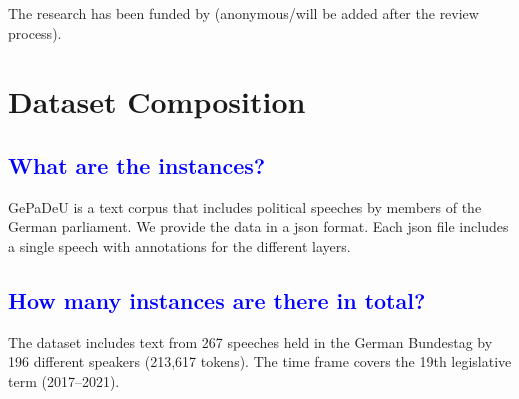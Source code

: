 \documentclass[letterpaper, 10 pt, conference]{ieeeconf}  %
\newcommand{\gepadeu}{{\sc GePaDeU}}
\begin{document}
The research has been funded by  (anonymous/will be added after the review process).

  

\vspace{1.8cm}

\section{Dataset Composition}

\textcolor{blue}{\subsection{What are the instances?}}

\gepadeu{} is a text corpus that includes political speeches by members of the German parliament. We provide the data in a json format.
Each json file includes a single speech with annotations for the different layers. 


\textcolor{blue}{\subsection{How many instances are there in total?}}%

The dataset includes text from 267 speeches held in the German Bundestag by 196 different speakers (213,617 tokens). The time frame covers the 19th legislative term (2017--2021).

\end{document}
